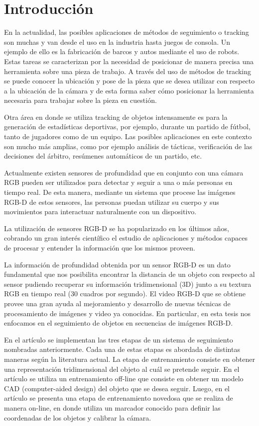 \chapter{Introducción}
En la actualidad, las posibles aplicaciones de métodos de seguimiento o tracking son muchas y van desde el uso en la industria hasta juegos de consola. Un ejemplo de ello es la fabricación de barcos y autos mediante el uso de robots. Estas tareas se caracterizan por la necesidad de posicionar de manera precisa una herramienta sobre una pieza de trabajo. A través del uso de métodos de tracking se puede conocer la ubicación y pose de la pieza que se desea utilizar con respecto a la ubicación de la cámara y de esta forma saber cómo posicionar la herramienta necesaria para trabajar sobre la pieza en cuestión.

Otra área en donde se utiliza tracking de objetos intensamente es para la generación de estadísticas deportivas, por ejemplo, durante un partido de fútbol, tanto de jugadores como de un equipo. Las posibles aplicaciones en este contexto son mucho más amplias, como por ejemplo análisis de tácticas, verificación de las decisiones del árbitro, resúmenes automáticos de un partido, etc.

Actualmente existen sensores de profundidad que en conjunto con una cámara RGB pueden ser utilizados para detectar y seguir a una o más personas en tiempo real. De esta manera, mediante un sistema que procese las imágenes RGB-D de estos sensores, las personas puedan utilizar su cuerpo y sus movimientos para interactuar naturalmente con un dispositivo.

La utilización de sensores RGB-D se ha popularizado en los últimos años, cobrando un gran interés científico el estudio de aplicaciones y métodos capaces de procesar y entender la información que los mismos proveen.

La información de profundidad obtenida por un sensor RGB-D es un dato fundamental que nos posibilita encontrar la distancia de un objeto con respecto al sensor pudiendo recuperar su información tridimensional (3D) junto a su textura RGB en tiempo real (30 cuadros por segundo). El video RGB-D que se obtiene provee una gran ayuda al mejoramiento y desarrollo de nuevas técnicas de procesamiento de imágenes y video ya conocidas. En particular, en esta tesis nos enfocamos en el seguimiento de objetos en secuencias de imágenes RGB-D.

En el artículo \cite{park2011texture} se implementan las tres etapas de un sistema de seguimiento nombradas anteriormente. Cada una de estas etapas es abordada de distintas maneras según la literatura actual.
La etapa de entrenamiento consiste en obtener una representación tridimensional del objeto al cuál se pretende seguir. En el artículo \cite{drummond1999real} se utiliza un entrenamiento off-line que consiste en obtener un modelo CAD (computer-aided design) del objeto que se desea seguir. Luego, en el artículo \cite{park2011texture} se presenta una etapa de entrenamiento novedosa que se realiza de manera on-line, en donde utiliza un marcador conocido para definir las coordenadas de los objetos y calibrar la cámara.

